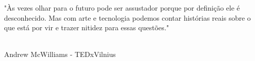 %
%
\thispagestyle{empty}
\begin{epigrafe}


"Às vezes olhar para o futuro pode ser assustador porque por definição ele é desconhecido. Mas com arte e tecnologia podemos contar histórias reais sobre o que está por vir e trazer nitidez para essas questões."
{\\}{\\}

\begin{autorepigrafe}
Andrew McWilliams - TEDxVilnius
\end{autorepigrafe}

\end{epigrafe}


